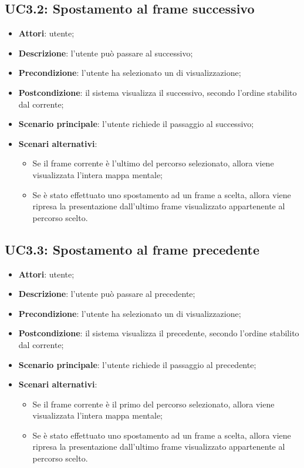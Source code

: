 \subsection{UC3.2: Spostamento al frame successivo}
\label{UC3.2}
\begin{itemize}
\item \textbf{Attori}: utente;
\item \textbf{Descrizione}: l'utente può passare al  successivo;
\item \textbf{Precondizione}: l'utente ha selezionato un  di visualizzazione;
\item \textbf{Postcondizione}: il sistema visualizza il  successivo, secondo l'ordine stabilito dal  corrente;
\item \textbf{Scenario principale}:
l'utente richiede il passaggio al  successivo;
\item \textbf{Scenari alternativi}:
\begin{itemize} \item Se il frame corrente è l'ultimo del percorso selezionato, allora viene visualizzata l'intera mappa mentale; \item Se è stato effettuato uno spostamento ad un frame a scelta, allora viene ripresa la presentazione dall'ultimo frame visualizzato appartenente al percorso scelto. \end{itemize}
\end{itemize}
\subsection{UC3.3: Spostamento al frame precedente}
\label{UC3.3}
\begin{itemize}
\item \textbf{Attori}: utente;
\item \textbf{Descrizione}: l'utente può passare al  precedente;
\item \textbf{Precondizione}: l'utente ha selezionato un  di visualizzazione;
\item \textbf{Postcondizione}: il sistema visualizza il  precedente, secondo l'ordine stabilito dal  corrente;
\item \textbf{Scenario principale}:
l'utente richiede il passaggio al  precedente;
\item \textbf{Scenari alternativi}:
\begin{itemize} \item Se il frame corrente è il primo del percorso selezionato, allora viene visualizzata l'intera mappa mentale; \item Se è stato effettuato uno spostamento ad un frame a scelta, allora viene ripresa la presentazione dall'ultimo frame visualizzato appartenente al percorso scelto. \end{itemize}
\end{itemize}
